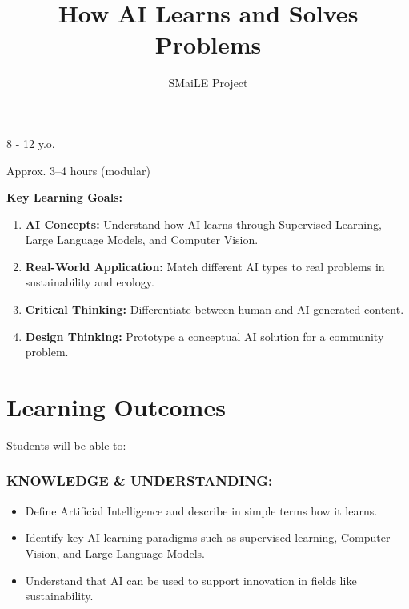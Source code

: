 \documentclass[11pt, a4paper]{article}
\begin{document}
\title{\textbf{\color{SmaileBlue}How AI Learns and Solves Problems}}
\author{SMaiLE Project}
\date{}
\maketitle
\thispagestyle{plain}

\begin{keyinfobox}
    \begin{description}[leftmargin=*, labelindent=0pt]
        \item[\bfseries\color{SmaileBlue} Target Group:] 8 - 12 y.o.
        \item[\bfseries\color{SmaileBlue} Duration:] Approx. 3--4 hours (modular)
    \end{description}
    \textbf{Key Learning Goals:}
    \begin{enumerate}
        \item \textbf{AI Concepts:} Understand how AI learns through Supervised Learning, Large Language Models, and Computer Vision.
        \item \textbf{Real-World Application:} Match different AI types to real problems in sustainability and ecology.
        \item \textbf{Critical Thinking:} Differentiate between human and AI-generated content.
        \item \textbf{Design Thinking:} Prototype a conceptual AI solution for a community problem.
    \end{enumerate}
\end{keyinfobox}

\section*{Learning Outcomes}
Students will be able to:

\subsubsection*{KNOWLEDGE \& UNDERSTANDING:}
\begin{itemize}
    \item Define Artificial Intelligence and describe in simple terms how it learns.
    \item Identify key AI learning paradigms such as supervised learning, Computer Vision, and Large Language Models.
    \item Understand that AI can be used to support innovation in fields like sustainability.
\end{itemize}
\end{document}
